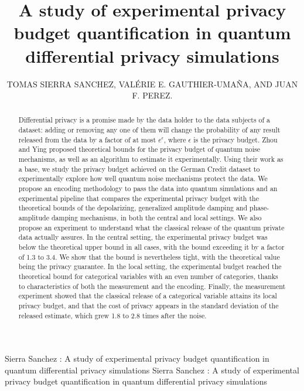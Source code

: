 \documentclass{ieeeaccess}
\begin{document}

\title{A study of experimental privacy budget quantification in quantum differential privacy simulations}
\author{\uppercase{Tomas Sierra Sanchez},
\uppercase{Valérie E. Gauthier-Umaña, and Juan F. Perez}.}
\address[1]{Department of Systems and Computing Engineering, Universidad de los Andes  (email: t.sierras@uniandes.edu.co)}
\address[2]{Advisor, Department of Systems and Computing Engineering, Universidad de los Andes, Bogotá D.C, Colombia}
\address[3]{Advisor, Department of Industrial Engineering, Universidad de los Andes, Bogotá D.C, Colombia (email: jf.perez33@uniandes.edu.co)}

\markboth
{Sierra Sanchez \headeretal: A study of experimental privacy budget quantification in quantum differential privacy simulations}
{Sierra Sanchez \headeretal: A study of experimental privacy budget quantification in quantum differential privacy simulations}

\begin{abstract}

  Differential privacy is a promise made by the data holder to the data subjects of a dataset: adding or removing any one of them will change the probability of any result released from the data by a factor of at most $e^{\epsilon}$, where $\epsilon$ is the privacy budget. Zhou and Ying proposed theoretical bounds for the privacy budget of quantum noise mechanisms, as well as an algorithm to estimate it experimentally. Using their work as a base, we study the privacy budget achieved on the German Credit dataset to experimentally explore how well quantum noise mechanisms protect the data. We propose an encoding methodology to pass the data into quantum simulations and an experimental pipeline that compares the experimental privacy budget with the theoretical bounds of the depolarizing, generalized amplitude damping and phase-amplitude damping mechanisms, in both the central and local settings. We also propose an experiment to understand what the classical release of the quantum private data actually assures. In the central setting, the experimental privacy budget was below the theoretical upper bound in all cases, with the bound exceeding it by a factor of 1.3 to 3.4. We show that the bound is nevertheless tight, with the theoretical value being the privacy guarantee. In the local setting, the experimental budget reached the theoretical bound for categorical variables with an even number of categories, thanks to characteristics of both the measurement and the encoding. Finally, the measurement experiment showed that the classical release of a categorical variable attains its local privacy budget, and that the cost of privacy appears in the standard deviation of the released estimate, which grew 1.8 to 2.8 times after the noise.

\end{abstract}
\end{document}
